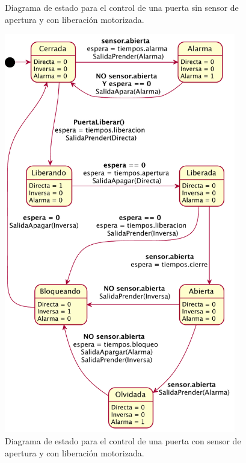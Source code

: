 \begin{itemize}
\begin{figure}[H]
	\caption[Diagrama de estados con cerradura motorizada y sin sensor]{Diagrama de estado para el control de una puerta sin sensor de apertura y con liberación motorizada.}
	\label{fig:ControlConSin}
\end{figure}

\begin{figure}[ht]
	\centering
	\includegraphics[width=0.9\textwidth]{Figures/PNK-DE004.pdf}
	\caption[Diagrama de estados con cerradura motorizada y sensor]{Diagrama de estado para el control de una puerta con sensor de apertura y con liberación motorizada.}
	\label{fig:ControlConCon}
\end{figure}
	

\end{itemize}
